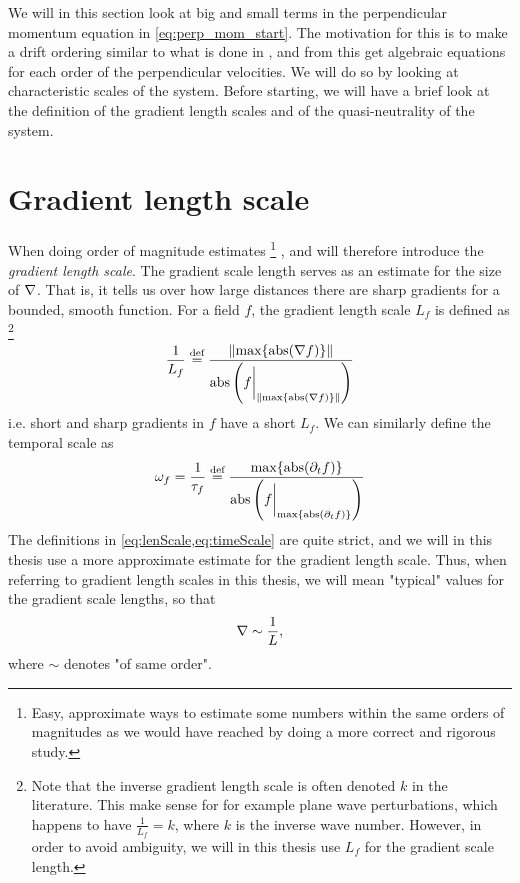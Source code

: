 We will in this section look at big and small terms in the perpendicular momentum equation in \cref{eq:perp_mom_start}.
The motivation for this is to make a drift ordering similar to what is done in \cite{Fitzpatrick2014book}, and from this get algebraic equations for each order of the perpendicular velocities.
We will do so by looking at characteristic scales of the system.
Before starting, we will have a brief look at the definition of the gradient length scales and of the quasi-neutrality of the system.

\section{Gradient length scale}
When doing order of magnitude estimates%
\footnote{
    Easy, approximate ways to estimate some numbers within the same orders of magnitudes as we would have reached by doing a more correct and rigorous study.
}%
, and will therefore introduce the \emph{gradient length scale}.
The gradient scale length serves as an estimate for the size of $\nabla$.
That is, it tells us over how large distances there are sharp gradients for a bounded, smooth function.
For a field $f$, the gradient length scale $L_f$ is defined as%
\footnote{
    Note that the inverse gradient length scale is often denoted $k$ in the literature.
    This make sense for for example plane wave perturbations, which happens to have $\frac{1}{L_f}=k$, where $k$ is the inverse wave number.
    However, in order to avoid ambiguity, we will in this thesis use $L_f$ for the gradient scale length.
}%
%
\begin{align}
    \frac{1}{L_f} \overset{\text{def}}{=} \frac{\|\text{max}\{\operatorname{abs}(\nabla f)\}\|}{\operatorname{abs}\left(f\bigg|_{\|\text{max}\{\operatorname{abs}(\nabla f)\}\|}\right)}
    \label{eq:lenScale}
\end{align}
%
i.e. short and sharp gradients in $f$ have a short $L_f$.
We can similarly define the temporal scale as
%
\begin{align}
    \omega_f = \frac{1}{\tau_f} \overset{\text{def}}{=} \frac{\text{max}\{\operatorname{abs}(\partial_t f)\}}{\operatorname{abs}\left(f\bigg|_{\text{max}\{\operatorname{abs}(\partial_t f)\}}\right)}
    \label{eq:timeScale}
\end{align}
%
The definitions in \cref{eq:lenScale,eq:timeScale} are quite strict, and we will in this thesis use a more approximate estimate for the gradient length scale.
Thus, when referring to gradient length scales in this thesis, we will mean "typical" values for the gradient scale lengths, so that
%
\begin{align*}
    \nabla \sim \frac{1}{L},
\end{align*}
%
where $\sim$ denotes "of same order".

